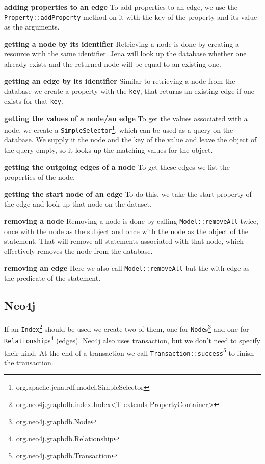 \textbf{adding properties to an edge} \newline
To add properties to an edge,
we use the \texttt{Property::addProperty} method on it with the key of the property and its value as the arguments.

\textbf{getting a node by its identifier} \newline
Retrieving a node is done by creating a resource with the same identifier.
Jena will look up the database whether one already exists and the returned node will be equal to an existing one.

\textbf{getting an edge by its identifier} \newline
Similar to retrieving a node from the database we create a property with the \texttt{key},
that returns an existing edge if one exists for that \texttt{key}.

\textbf{getting the values of a node/an edge} \newline
To get the values associated with a node,
we create a \texttt{SimpleSelector}\footnote{org.apache.jena.rdf.model.SimpleSelector},
which can be used as a query on the database.
We supply it the node and the key of the value and leave the object of the query empty,
so it looks up the matching values for the object.

\textbf{getting the outgoing edges of a node} \newline
To get these edges we list the properties of the node.

\textbf{getting the start node of an edge} \newline
To do this,
we take the start property of the edge and look up that node on the dataset.

\textbf{removing a node} \newline
Removing a node is done by calling \texttt{Model::removeAll} twice,
once with the node as the subject and once with the node as the object of the statement.
That will remove all statements associated with that node,
which effectively removes the node from the database.

\textbf{removing an edge} \newline
Here we also call \texttt{Model::removeAll} but the with edge as the predicate of the statement.

\subsection{Neo4j}
If an \texttt{Index}\footnote{org.neo4j.graphdb.index.Index<T extends PropertyContainer>} should be used we create two of them,
one for \texttt{Node}s\footnote{org.neo4j.graphdb.Node} and one for \texttt{Relationship}s\footnote{org.neo4j.graphdb.Relationship} (edges).
Neo4j also uses transaction,
but we don't need to specify their kind.
At the end of a transaction we call \texttt{Transaction::success}\footnote{org.neo4j.graphdb.Transaction} to finish the transaction.

